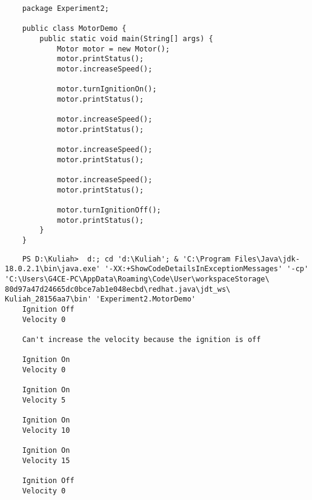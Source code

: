 \documentclass[12pt,titlepage]{article}
\begin{document}
\begin{verbatim}
    package Experiment2;

    public class MotorDemo {
        public static void main(String[] args) {
            Motor motor = new Motor();
            motor.printStatus();
            motor.increaseSpeed();

            motor.turnIgnitionOn();
            motor.printStatus();

            motor.increaseSpeed();
            motor.printStatus();

            motor.increaseSpeed();
            motor.printStatus();

            motor.increaseSpeed();
            motor.printStatus();

            motor.turnIgnitionOff();
            motor.printStatus();
        }
    }

\end{verbatim}

\begin{verbatim}
    PS D:\Kuliah>  d:; cd 'd:\Kuliah'; & 'C:\Program Files\Java\jdk-18.0.2.1\bin\java.exe' '-XX:+ShowCodeDetailsInExceptionMessages' '-cp' 'C:\Users\G4CE-PC\AppData\Roaming\Code\User\workspaceStorage\ 80d97a47d24665dc0bce7ab1e048ecbd\redhat.java\jdt_ws\ Kuliah_28156aa7\bin' 'Experiment2.MotorDemo' 
    Ignition Off
    Velocity 0

    Can't increase the velocity because the ignition is off

    Ignition On
    Velocity 0

    Ignition On
    Velocity 5

    Ignition On
    Velocity 10

    Ignition On
    Velocity 15

    Ignition Off
    Velocity 0

\end{verbatim}
\end{document}
